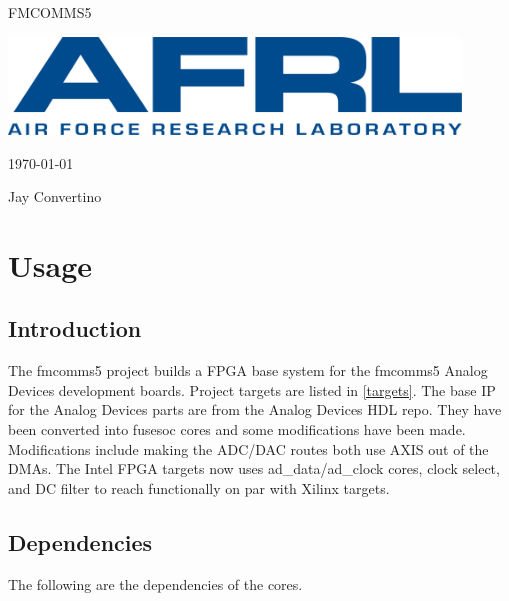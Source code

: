 \begin{titlepage}
  \begin{center}

  {\Huge FMCOMMS5}

  \vspace{25mm}

  \includegraphics[width=0.90\textwidth,height=\textheight,keepaspectratio]{img/AFRL.png}

  \vspace{25mm}

  \today

  \vspace{15mm}

  {\Large Jay Convertino}

  \end{center}
\end{titlepage}

\tableofcontents

\newpage

\section{Usage}

\subsection{Introduction}

\par
The fmcomms5 project builds a FPGA base system for the fmcomms5 Analog Devices development boards.
Project targets are listed in \ref{targets}. The base IP for the Analog Devices parts are from the Analog Devices HDL repo.
They have been converted into fusesoc cores and some modifications have been made. Modifications include making the ADC/DAC
routes both use AXIS out of the DMAs. The Intel FPGA targets now uses ad\_data/ad\_clock cores, clock select, and DC filter
to reach functionally on par with Xilinx targets.

\subsection{Dependencies}

\par
The following are the dependencies of the cores.

